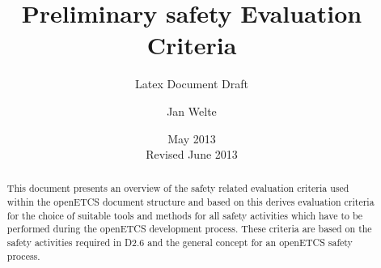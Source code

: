 \documentclass{template/openetcs_article}
\begin{document}
\frontmatter
{}




\title{Preliminary safety Evaluation Criteria}

\subtitle{Latex Document Draft}

\date{May 2013\\Revised June 2013}


\author{Jan Welte}





\begin{abstract}
  This document presents an overview of the safety related evaluation criteria used within the openETCS document structure and based on this derives evaluation criteria for the choice of suitable tools and methods for all safety activities which have to be performed during the openETCS development process. These criteria are based on the safety activities required in D2.6 and the general concept for an openETCS safety process. 
\end{abstract}

\maketitle
\tableofcontents
\listoffiguresandtables
\newpage

\end{document}
